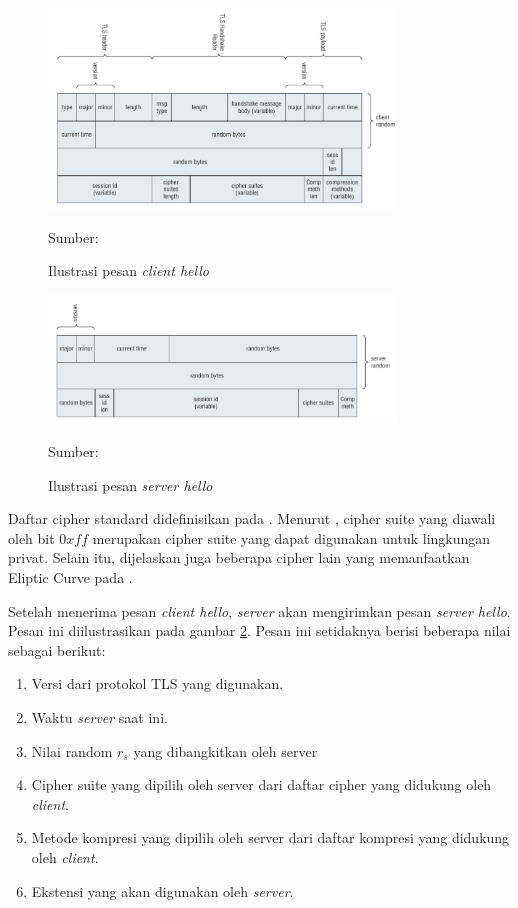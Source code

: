 \begin{figure}[!h]
  \centering
  \includegraphics[width=350px]{chapters/res/chapter-2/img/tls.hello.client.png}
  \caption{Ilustrasi pesan \emph{client hello}} \label{fig:tls.clienthello}
  Sumber: \textcite{joshua2011}
\end{figure}

\begin{figure}[!h]
  \centering
  \includegraphics[width=350px]{chapters/res/chapter-2/img/tls.hello.server.png}
  \caption{Ilustrasi pesan \emph{server hello}} \label{fig:tls.serverhello}
  Sumber: \textcite{joshua2011}
\end{figure}

 Daftar cipher standard didefinisikan pada \textcite{rfc5246}. Menurut \textcite{rfc5246}, cipher suite yang diawali oleh bit $0xff$ merupakan cipher suite yang dapat digunakan untuk lingkungan privat. Selain itu, dijelaskan juga beberapa cipher lain yang memanfaatkan Eliptic Curve pada \textcite{rfc4492}. 

Setelah menerima pesan \emph{client hello}, \emph{server} akan mengirimkan pesan \emph{server hello}. Pesan ini diilustrasikan pada gambar \ref{fig:tls.serverhello}. Pesan ini setidaknya berisi beberapa nilai sebagai berikut:
\begin{enumerate}
  \item Versi dari protokol TLS yang digunakan.
  \item Waktu \emph{server} saat ini.
  \item Nilai random $r_s$ yang dibangkitkan oleh server 
  \item Cipher suite yang dipilih oleh server dari daftar cipher yang didukung oleh \emph{client}.
  \item Metode kompresi yang dipilih oleh server dari daftar kompresi yang didukung oleh \emph{client}.
  \item Ekstensi yang akan digunakan oleh \emph{server}.
\end{enumerate}

